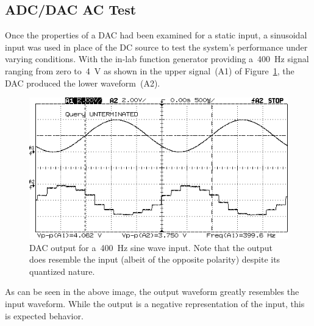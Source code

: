 \subsection{ADC/DAC AC Test}
Once the properties of a DAC had been examined for a static input, a sinusoidal input was used in place of the DC source to test the system's performance under varying conditions.  With the in-lab function generator providing a~\SI{400}{\hertz} signal ranging from zero to~\SI{4}{\volt} as shown in the upper signal~(A1) of Figure~\ref{fig:pt4a}, the DAC produced the lower waveform~(A2).
%
\begin{figure}[H]
	\centering
	\includegraphics[width=.6\textwidth]{img/shot/pt4ashot.png}
	\parbox{.6\textwidth}{
	\caption[\SI{400}{\hertz} Sine Wave --- All Closed]{DAC output for a~\SI{400}{\hertz} sine wave input.  Note that the output does resemble the input (albeit of the opposite polarity) despite its quantized nature.}
	\label{fig:pt4a}}
\end{figure}
%
As can be seen in the above image, the output waveform greatly resembles the input waveform.  While the output is a negative representation of the input, this is expected behavior.

